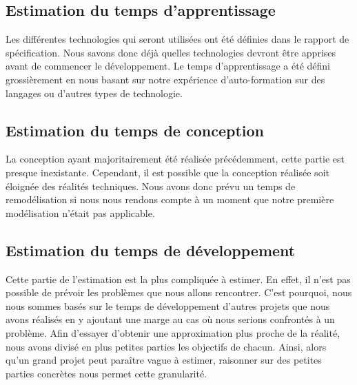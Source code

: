 \subsection{Estimation du temps d'apprentissage}

Les différentes technologies qui seront utilisées ont été définies dans le rapport de spécification. Nous savons donc déjà quelles technologies devront être apprises avant de commencer le développement. Le temps d’apprentissage a été défini grossièrement en nous basant sur notre expérience d’auto-formation sur des langages ou d’autres types de technologie.

\newpage

\subsection{Estimation du temps de conception}

La conception ayant majoritairement été réalisée précédemment, cette partie est presque inexistante. Cependant, il est possible que la conception réalisée soit éloignée des réalités techniques. Nous avons donc prévu un temps de remodélisation si nous nous rendons compte à un moment que notre première modélisation n’était pas applicable.

\subsection{Estimation du temps de développement}

Cette partie de l’estimation est la plus compliquée à estimer. En effet, il n’est pas possible de prévoir les problèmes que nous allons rencontrer. C’est pourquoi, nous nous sommes basés sur le temps de développement d’autres projets que nous avons réalisés en y ajoutant une marge au cas où nous serions confrontés à un problème. Afin d’essayer d’obtenir une approximation plus proche de la réalité, nous avons divisé en plus petites parties les objectifs de chacun. Ainsi, alors qu’un grand projet peut paraître vague à estimer, raisonner sur des petites parties concrètes nous permet cette granularité.
